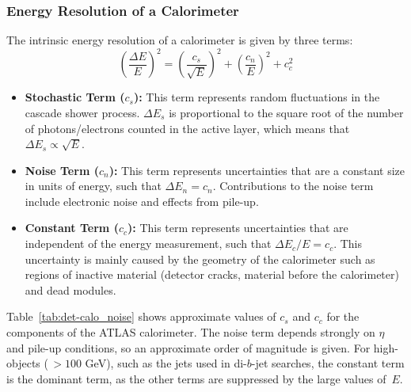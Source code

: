 \subsubsection{Energy Resolution of a Calorimeter}
\label{sec:det-calo_noise}

The intrinsic energy resolution of a calorimeter is given by three terms:
\begin{equation}
  \left(\frac{\Delta E}{E}\right)^2 = \left(\frac{c_s}{\sqrt{E}}\right)^2 + \left(\frac{c_n}{E}\right)^2 + c_c^2
\end{equation}

\begin{itemize}[leftmargin=*]
\item\textbf{Stochastic Term ($c_s$):}
  This term represents random fluctuations in the cascade shower process.
  $\Delta E_s$ is proportional to the square root of the number of photons/electrons counted in the active layer,
  which means that $\Delta E_s \propto \sqrt{E}$. \vspace{0.5em}
\item\textbf{Noise Term ($c_n$):}
  This term represents uncertainties that are a constant size in units of energy, such that $\Delta E_n = c_n$.
  Contributions to the noise term include electronic noise and effects from pile-up. \vspace{0.5em} %
\item\textbf{Constant Term ($c_c$):}
  This term represents uncertainties that are independent of the energy measurement, such that $\Delta E_c/E = c_c$.
  This uncertainty is mainly caused by the geometry of the calorimeter such as regions of inactive material (detector cracks, material before the calorimeter) and dead modules.
\end{itemize}

Table~\ref{tab:det-calo_noise} shows approximate values of $c_s$ and $c_c$ for the components of the ATLAS calorimeter.
The noise term depends strongly on $\eta$ and pile-up conditions, so an approximate order of magnitude is given.
For high-\pT{} objects ($\,> 100$ GeV), such as the jets used in di-$b$-jet searches, the constant term is the dominant term,
as the other terms are suppressed by the large values of~$E$.

